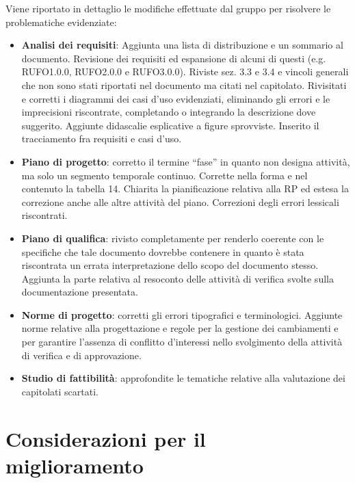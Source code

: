 Viene riportato in dettaglio le modifiche effettuate dal gruppo per risolvere le problematiche evidenziate:

\begin{itemize}
\item \textbf{Analisi dei requisiti}: Aggiunta una lista di distribuzione e un sommario al documento. Revisione dei requisiti ed espansione di alcuni di questi (e.g. RUFO1.0.0, RUFO2.0.0 e RUFO3.0.0). Riviste sez. 3.3 e 3.4 e vincoli generali che non sono stati riportati nel documento ma citati nel capitolato. Rivisitati e corretti i diagrammi dei casi d'uso evidenziati, eliminando gli errori e le imprecisioni riscontrate, completando o integrando la descrizione dove suggerito. Aggiunte didascalie esplicative a figure sprovviste. Inserito il tracciamento fra requisiti e casi d'uso.

\item \textbf{Piano di progetto}: corretto il termine ``fase'' in quanto non designa attività, ma solo un segmento temporale continuo. Corrette nella forma e nel contenuto la tabella 14. Chiarita la pianificazione relativa alla \underline{} RP ed estesa la correzione anche alle altre attività del piano. Correzioni degli errori lessicali riscontrati.

\item \textbf{Piano di qualifica}: rivisto completamente per renderlo coerente con le specifiche che tale documento dovrebbe contenere in quanto è stata riscontrata un errata interpretazione dello scopo del documento stesso.
Aggiunta la parte relativa al resoconto delle attività di verifica svolte sulla documentazione presentata.

\item \textbf{Norme di progetto}: corretti gli errori tipografici e terminologici. Aggiunte norme relative alla progettazione e regole per la gestione dei cambiamenti e per garantire l'assenza di conflitto d'interessi nello svolgimento della attività di verifica e di approvazione.

\item \textbf{Studio di fattibilità}: approfondite le tematiche relative alla valutazione dei capitolati scartati.
\end{itemize}
\clearpage

 
\section{Considerazioni per il miglioramento}

